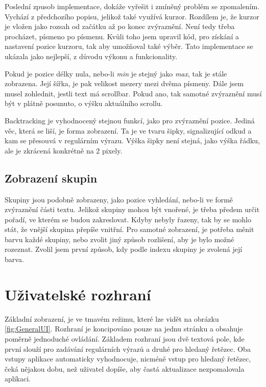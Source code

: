 Poslední zpusob implementace, dokáže vyřešit i zmíněný problém se zpomalením.
Vychází z předchozího popisu, jelikož také využívá kurzor.
Rozdílem je, že kurzor je vložen jako rozsah od začátku až po konec zvýraznění.
Není tedy třeba procházet, písmeno po písmenu.
Kvůli toho jsem upravil kód, pro získání a nastavení pozice kurzoru, tak aby umožňoval také výběr.
Tato implementace se ukázala jako nejlepší, z důvodu výkonu a funkcionality.

Pokud je pozice délky nula, nebo-li \textit{min} je stejný jako \textit{max}, tak je stále zobrazena. 
Její šířka, je pak velikost mezery mezi dvěma písmeny. 
Dále jsem musel zohlednit, jestli text má scrollbar. 
Pokud ano, tak samotné zvýraznění musí být v plátně posunuto, o výšku aktuálního scrollu.

Backtracking je vyhodnocený stejnou funkcí, jako pro zvýraznění pozice.
Jediná věc, která se liší, je forma zobrazení. 
Ta je ve tvaru šipky, signalizující odkud a kam se přesouvá v regulárním výrazu.
Výška šipky není stejná, jako výška řádku, ale je zkrácená konkrétně na 2 pixely.

\subsection*{Zobrazení skupin}

Skupiny jsou podobně zobrazeny, jako pozice vyhledání, nebo-li ve formě zvýraznění části textu.
Jelikož skupiny mohou být vnořené, je třeba předem určit pořadí, ve kterém se budou zakreslovat.
Kdyby nebyly řazeny, tak by se mohlo stát, že vnější skupina přepíše vnitřní.
Pro samotné zobrazení, je potřeba měnit barvu každé skupiny, nebo zvolit jiný způsob rozlišení, aby je bylo možné rozeznat.
Zvolil jsem první způsob, kdy podle indexu skupiny je zvolená její barva.

\section{Uživatelské rozhraní}

Základní zobrazení, je ve tmavém režimu, které lze vidět na obrázku \ref{fig:GeneralUI}.
Rozhraní je koncipováno pouze na jednu stránku a obsahuje poměrně jednoduché ovládání.
Základem rozhraní jsou dvě textová pole, kde první slouží pro zadávání regulárních výrazů a druhé pro hledaný řetězec.
Oba vstupy aplikace automaticky vyhodnocuje, nicméně vstup pro hledaný řetězec, čeká nějakou dobu, než uživatel dopíše, aby častá aktualizace nezpomalovala aplikaci.

